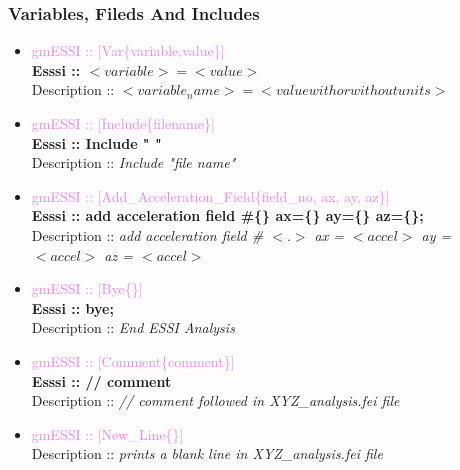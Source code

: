 \documentclass[11pt]{article}
\begin{document}
\subsubsection{Variables, Fileds And Includes}

  \begin{itemize}

    \item \textcolor{violet}{gmESSI :: [Var\{variable,value\}]} \\             
    \textbf{Esssi :: $<variable> = <value>$}\\
    Description :: \textit{$<variable_name> = <value with or without units>$}

    \item \textcolor{violet}{gmESSI :: [Include\{filename\}]} \\             
    \textbf{Esssi :: Include " "}\\
    Description :: \textit{Include "file name"}

    \item \textcolor{violet}{gmESSI :: [Add_Acceleration_Field\{field_no, ax, ay, az\}]} \\             
    \textbf{Esssi :: add acceleration field \#\{\} ax=\{\} ay=\{\} az=\{\}; }\\
    Description :: \textit{add acceleration field \# $<.>$ ax = $<accel>$ ay = $<accel>$ az = $<accel>$}

    \item \textcolor{violet}{gmESSI :: [Bye\{\}]} \\ 
    \textbf{Esssi :: bye; }\\            
    Description :: \textit{End ESSI Analysis}

    \item \textcolor{violet}{gmESSI :: [Comment\{comment\}]} \\             
    \textbf{Esssi :: // comment}\\
    Description :: \textit{// comment followed in XYZ_analysis.fei file}

    \item \textcolor{violet}{gmESSI :: [New_Line\{\}]} \\             
    Description :: \textit{prints a blank line in XYZ_analysis.fei file}

  \end{itemize}

\end{document}
